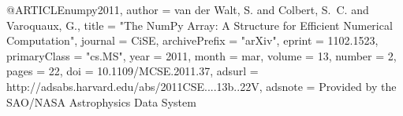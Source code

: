 
@ARTICLE{numpy2011,
   author = {{van der Walt}, S. and {Colbert}, S.~C. and {Varoquaux}, G.},
    title = "{The NumPy Array: A Structure for Efficient Numerical Computation}",
  journal = {CiSE},
archivePrefix = "arXiv",
   eprint = {1102.1523},
 primaryClass = "cs.MS",
     year = 2011,
    month = mar,
   volume = 13,
   number = 2,
    pages = {22},
      doi = {10.1109/MCSE.2011.37},
   adsurl = {http://adsabs.harvard.edu/abs/2011CSE....13b..22V},
  adsnote = {Provided by the SAO/NASA Astrophysics Data System}
}
